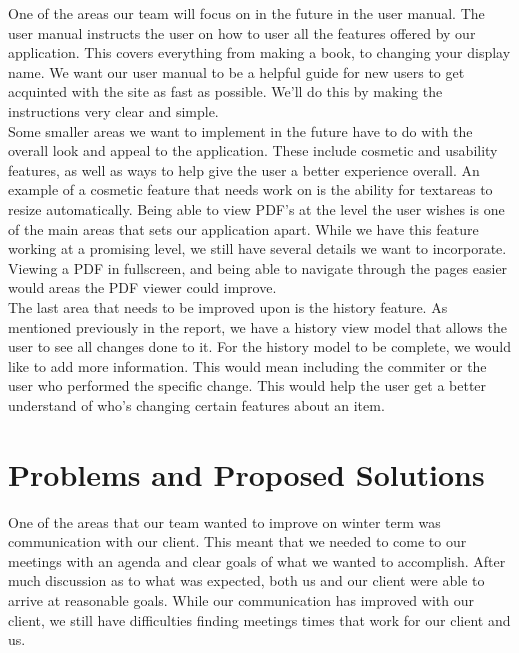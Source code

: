\documentclass[onecolumn, draftclsnofoot,10pt, compsoc]{IEEEtran}
\begin{document}
\noindent One of the areas our team will focus on in the future in the user manual. The user manual instructs 
the user on how to user all the features offered by our application. This covers everything from making 
a book, to changing your display name. We want our user manual to be a helpful guide for new users to get
acquinted with the site as fast as possible. We'll do this by making the instructions very clear and simple. \\

\noindent Some smaller areas we want to implement in the future have to do with the overall look and appeal
to the application. These include cosmetic and usability features, as well as ways to help give the user
a better experience overall. An example of a cosmetic feature that needs work on is the ability for textareas 
to resize automatically. Being able to view PDF's at the level the user wishes is one of the main areas that
sets our application apart. While we have this feature working at a promising level, we still have several 
details we want to incorporate. Viewing a PDF in fullscreen, and being able to navigate through the pages 
easier would areas the PDF viewer could improve. \\

\noindent The last area that needs to be improved upon is the history feature. As mentioned previously in the
report, we have a history view model that allows the user to see all changes done to it. For the history model 
to be complete, we would like to add more information. This would mean including the commiter or the user who 
performed the specific change. This would help the user get a better understand of who's changing certain 
features about an item. \\

\newpage

\section{Problems and Proposed Solutions} 

\noindent One of the areas that our team wanted to improve on winter term was communication with our client.
This meant that we needed to come to our meetings with an agenda and clear goals of what we wanted to 
accomplish. After much discussion as to what was expected, both us and our client were able to arrive at 
reasonable goals. While our communication has improved with our client, we still have difficulties finding 
meetings times that work for our client and us. \\
\end{document}
